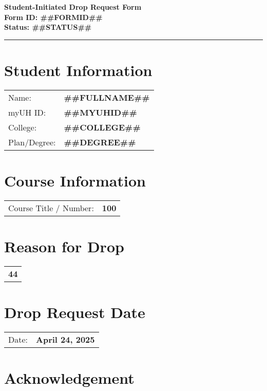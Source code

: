 \documentclass[12pt]{article}
\begin{document}
\begin{center}
  \textbf{\Large Student-Initiated Drop Request Form}\\[0.2cm]
  \textbf{Form ID: ##FORMID##}\\[0.2cm]
  \textbf{Status: ##STATUS##}
\end{center}

\hrule
\vspace{0.5cm}

\section*{Student Information}
\begin{tabular}{ll}
Name: & \textbf{##FULLNAME##} \\
myUH ID: & \textbf{##MYUHID##} \\
College: & \textbf{##COLLEGE##} \\
Plan/Degree: & \textbf{##DEGREE##} \\
\end{tabular}

\vspace{0.5cm}

\section*{Course Information}
\begin{tabular}{ll}
Course Title / Number: & \textbf{100} \\
\end{tabular}

\section*{Reason for Drop}
\begin{tabular}{p{12cm}}
\textbf{44}
\end{tabular}

\section*{Drop Request Date}
\begin{tabular}{ll}
Date: & \textbf{April 24, 2025} \\
\end{tabular}

\section*{Acknowledgement}
\noindent{}
\end{document}
